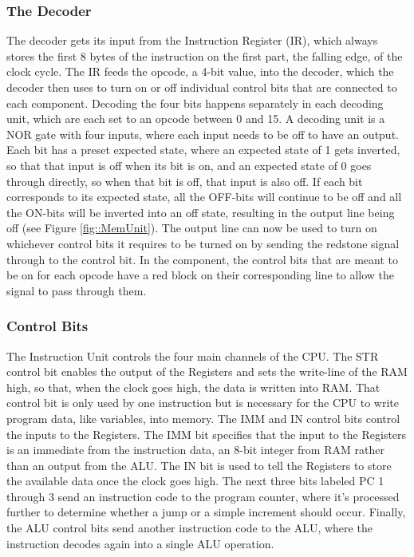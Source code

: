 \subsubsection{The Decoder}
The decoder gets its input from the Instruction Register (IR), which always stores the first 8 bytes of the instruction on the first part, the falling edge, of the clock cycle. The IR feeds the opcode, a 4-bit value, into the decoder, which the decoder then uses to turn on or off individual control bits that are connected to each component. Decoding the four bits happens separately in each decoding unit, which are each set to an opcode between 0 and 15. A decoding unit is a NOR gate with four inputs, where each input needs to be off to have an output. Each bit has a preset expected state, where an expected state of 1 gets inverted, so that that input is off when its bit is on, and an expected state of 0 goes through directly, so when that bit is off, that input is also off. If each bit corresponds to its expected state, all the OFF-bits will continue to be off and all the ON-bits will be inverted into an off state, resulting in the output line being off (see Figure \ref{fig::MemUnit}). The output line can now be used to turn on whichever control bits it requires to be turned on by sending the redstone signal through to the control bit. In the component, the control bits that are meant to be on for each opcode have a red block on their corresponding line to allow the signal to pass through them.

\subsubsection{Control Bits}
The Instruction Unit controls the four main channels of the CPU. The STR control bit enables the output of the Registers and sets the write-line of the RAM high, so that, when the clock goes high, the data is written into RAM. That control bit is only used by one instruction but is necessary for the CPU to write program data, like variables, into memory. The IMM and IN control bits control the inputs to the Registers. The IMM bit specifies that the input to the Registers is an immediate from the instruction data, an 8-bit integer from RAM rather than an output from the ALU. The IN bit is used to tell the Registers to store the available data once the clock goes high. The next three bits labeled PC 1 through 3 send an instruction code to the program counter, where it's processed further to determine whether a jump or a simple increment should occur. Finally, the ALU control bits send another instruction code to the ALU, where the instruction decodes again into a single ALU operation.

